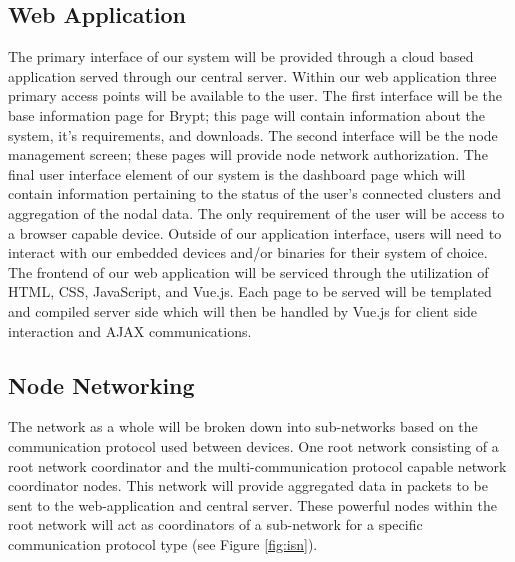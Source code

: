 \documentclass[tikz,a4paper,titlepage]{article}
\begin{document}


\subsection{Web Application}

The primary interface of our system will be provided through a cloud based application served through our central server. Within our web application three primary access points will be available to the user. The first interface will be the base information page for Brypt; this page will contain information about the system, it’s requirements, and downloads. The second interface will be the node management screen; these pages will provide node network authorization. The final user interface element of our system is the dashboard page which will contain information pertaining to the status of the user’s connected clusters and aggregation of the nodal data. The only requirement of the user will be access to a browser capable device. Outside of our application interface, users will need to interact with our embedded devices and/or binaries for their system of choice. The frontend of our web application will be serviced through the utilization of HTML, CSS, JavaScript, and Vue.js. Each page to be served will be templated and compiled server side which will then be handled by Vue.js for client side interaction and AJAX communications. 

\subsection{Node Networking}

The network as a whole will be broken down into sub-networks based on the communication protocol used between devices. One root network consisting of a root network coordinator and the multi-communication protocol capable network coordinator nodes. This network will provide aggregated data in packets to be sent to the web-application and central server. These powerful nodes within the root network will act as coordinators of a sub-network for a specific communication protocol type (see Figure \ref{fig:isn}).
\end{document}
